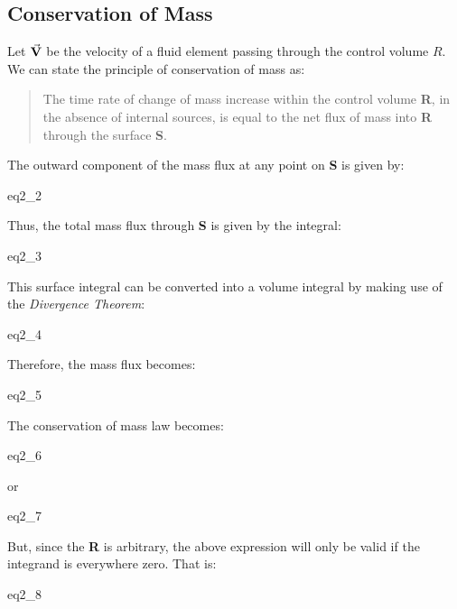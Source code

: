 \subsection{Conservation of Mass}

Let $\va{V}$ be the velocity of a fluid element passing
through the control volume $R$. We can state the principle of conservation of
mass as:

\begin{quote}
  The time rate of change of mass increase within the control volume {\bf R}, in
  the absence of internal sources, is equal to the net flux of mass into {\bf R}
  through the surface {\bf S}.
\end{quote}

The outward component of the mass flux at any point on {\bf S} is given by:

{eq2_2}

Thus, the total mass flux through {\bf S} is given by the integral:

{eq2_3}

This surface integral can be converted into a volume integral by making use of
the {\it Divergence Theorem}:

{eq2_4}

Therefore, the mass flux becomes:

{eq2_5}

The conservation of mass law becomes:
    
{eq2_6}

or

{eq2_7}

But, since the {\bf R} is arbitrary, the above expression will only be valid if
the integrand is everywhere zero. That is:

{eq2_8}


